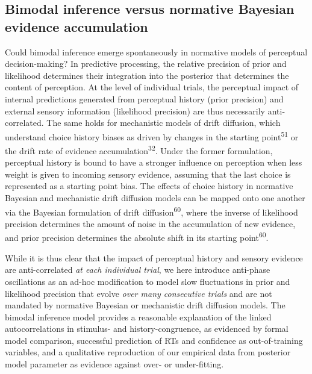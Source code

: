 \documentclass[
]{article}
\begin{document}
\hypertarget{bimodal-inference-versus-normative-bayesian-evidence-accumulation}{%
\subsection{Bimodal inference versus normative Bayesian evidence
accumulation}\label{bimodal-inference-versus-normative-bayesian-evidence-accumulation}}

Could bimodal inference emerge spontaneously in normative models of
perceptual decision-making? In predictive processing, the relative
precision of prior and likelihood determines their integration into the
posterior that determines the content of perception. At the level of
individual trials, the perceptual impact of internal predictions
generated from perceptual history (prior precision) and external sensory
information (likelihood precision) are thus necessarily anti-correlated.
The same holds for mechanistic models of drift diffusion, which
understand choice history biases as driven by changes in the starting
point\textsuperscript{51} or the drift rate of evidence
accumulation\textsuperscript{32}. Under the former formulation,
perceptual history is bound to have a stronger influence on perception
when less weight is given to incoming sensory evidence, assuming that
the last choice is represented as a starting point bias. The effects of
choice history in normative Bayesian and mechanistic drift diffusion
models can be mapped onto one another via the Bayesian formulation of
drift diffusion\textsuperscript{60}, where the inverse of likelihood
precision determines the amount of noise in the accumulation of new
evidence, and prior precision determines the absolute shift in its
starting point\textsuperscript{60}.

While it is thus clear that the impact of perceptual history and sensory
evidence are anti-correlated \emph{at each individual trial}, we here
introduce anti-phase oscillations as an ad-hoc modification to model
slow fluctuations in prior and likelihood precision that evolve
\emph{over many consecutive trials} and are not mandated by normative
Bayesian or mechanistic drift diffusion models. The bimodal inference
model provides a reasonable explanation of the linked autocorrelations
in stimulus- and history-congruence, as evidenced by formal model
comparison, successful prediction of RTs and confidence as
out-of-training variables, and a qualitative reproduction of our
empirical data from posterior model parameter as evidence against over-
or under-fitting.
\end{document}

